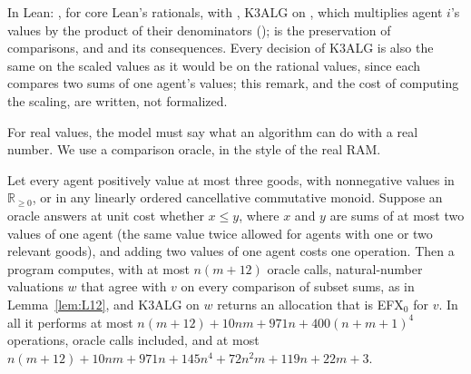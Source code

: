 \documentclass[runningheads,11pt]{llncs}
\newcommand{\efxz}{\texorpdfstring{\mbox{EFX$_0$}}{EFX0}}
\begin{document}
\noindent In Lean: , for core Lean's rationals, with , K3ALG on , which multiplies agent $i$'s values by the product of their denominators ();  is the preservation of comparisons, and  and  its consequences. Every decision of K3ALG is also the same on the scaled values as it would be on the rational values, since each compares two sums of one agent's values; this remark, and the cost of computing the scaling, are written, not formalized.

For real values, the model must say what an algorithm can do with a real number. We use a comparison oracle, in the style of the real RAM.

\begin{corollary}\label{cor:real}
Let every agent positively value at most three goods, with nonnegative values in $\mathbb{R}_{\ge0}$, or in any linearly ordered cancellative commutative monoid. Suppose an oracle answers at unit cost whether $x\le y$, where $x$ and $y$ are sums of at most two values of one agent (the same value twice allowed for agents with one or two relevant goods), and adding two values of one agent costs one operation. Then a program computes, with at most $n(m+12)$ oracle calls, natural-number valuations $w$ that agree with $v$ on every comparison of subset sums, as in Lemma~\ref{lem:L12}, and K3ALG on $w$ returns an allocation that is \efxz{} for $v$. In all it performs at most $n(m+12)+10nm+971n+400(n+m+1)^4$ operations, oracle calls included, and at most $n(m+12)+10nm+971n+145n^4+72n^2m+119n+22m+3$.
\end{corollary}
\end{document}
